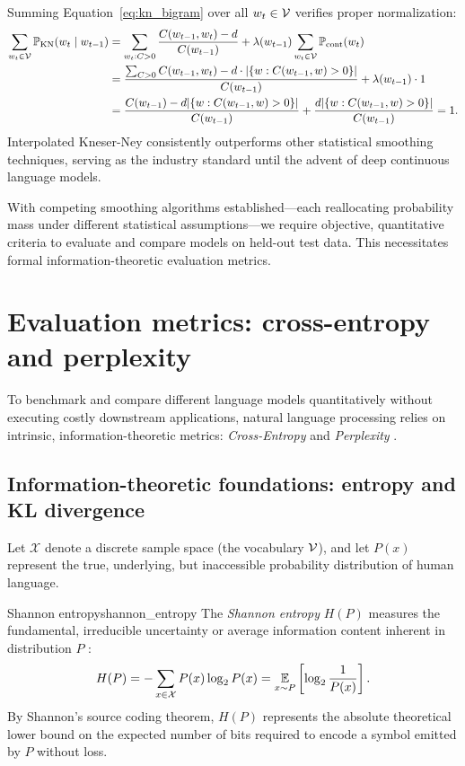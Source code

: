 \documentclass[../../main.tex]{subfiles}
\begin{document}
Summing Equation~\eqref{eq:kn_bigram} over all $w_t \in \mathcal{V}$ verifies proper normalization:
\begin{align}
\sum_{w_t \in \mathcal{V}} \mathbb{P}_{\text{KN}}(w_t \mid w_{t-1}) &= \sum_{w_t : C > 0} \frac{C(w_{t-1}, w_t) - d}{C(w_{t-1})} + \lambda(w_{t-1}) \sum_{w_t \in \mathcal{V}} \mathbb{P}_{\text{cont}}(w_t) \notag \\
&= \frac{\sum_{C > 0} C(w_{t-1}, w_t) - d \cdot |\{ w : C(w_{t-1}, w) > 0 \}|}{C(w_{t-1})} + \lambda(w_{t-1}) \cdot 1 \notag \\
&= \frac{C(w_{t-1}) - d |\{ w : C(w_{t-1}, w) > 0 \}|}{C(w_{t-1})} + \frac{d |\{ w : C(w_{t-1}, w) > 0 \}|}{C(w_{t-1})} = 1. \label{eq:kn_proof}
\end{align}
Interpolated Kneser-Ney consistently outperforms other statistical smoothing techniques, serving as the industry standard until the advent of deep continuous language models.

With competing smoothing algorithms established—each reallocating probability mass under different statistical assumptions—we require objective, quantitative criteria to evaluate and compare models on held-out test data. This necessitates formal information-theoretic evaluation metrics.

\clearpage
\section{Evaluation metrics: cross-entropy and perplexity}
\label{sec:eval_metrics}

To benchmark and compare different language models quantitatively without executing costly downstream applications, natural language processing relies on intrinsic, information-theoretic metrics: \emph{Cross-Entropy} and \emph{Perplexity} \cite{shannon1948,jurafsky2024}.

\subsection{Information-theoretic foundations: entropy and KL divergence}
Let $\mathcal{X}$ denote a discrete sample space (the vocabulary $\mathcal{V}$), and let $P(x)$ represent the true, underlying, but inaccessible probability distribution of human language. 

\begin{definition}{Shannon entropy}{shannon_entropy}
The \emph{Shannon entropy} $H(P)$ measures the fundamental, irreducible uncertainty or average information content inherent in distribution $P$ \cite{shannon1948}:
\begin{equation}
\label{eq:shannon_entropy}
H(P) = - \sum_{x \in \mathcal{X}} P(x) \log_2 P(x) = \operatorname*{\mathbb{E}}_{x \sim P}\left[ \log_2 \frac{1}{P(x)} \right].
\end{equation}
By Shannon's source coding theorem, $H(P)$ represents the absolute theoretical lower bound on the expected number of bits required to encode a symbol emitted by $P$ without loss.
\end{definition}
\end{document}

